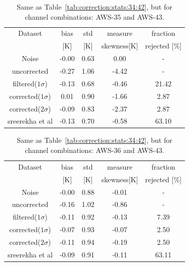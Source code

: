 \documentclass[12pt]{article}
\begin{document}
\begin{table}[!bt]
	\centering
	\begin{tabular}[b]{c|c|c|c|c}
		Dataset  		  &   bias &   std &   measure & fraction \\
							&   [K]  &   [K] & skewness[K] & rejected [\%]\\
		\hline
 Noise           	  &  -0.00 &  0.63 &               0.00 &                -\\
uncorrected     	  &  -0.27 &  1.06 &              -4.42 &                - \\
filtered($1\sigma$)	  &  -0.13 &  0.68 &              -0.46 &               21.42 \\
corrected($1\sigma$)  &   0.01 &  0.90 &              -1.66 &                2.87 \\
corrected($2\sigma$)  &  -0.09 &  0.83 &              -2.37 &                2.87 \\
sreerekha et al  	  &  -0.13 &  0.70 &              -0.58 &               63.10 \\

		\hline
	\end{tabular}
	\caption{Same as Table~\ref{tab:correction:stats:34:42}, but for channel combinations: AWS-35 and AWS-43.   }
	\label{tab:correction:stats:35:43}
\end{table}

\begin{table}[!bt]
	\centering
	\begin{tabular}[b]{c|c|c|c|c}
		Dataset  		  &   bias &   std &   measure & fraction  \\
							&   [K]  &   [K] & skewness[K] & rejected [\%]\\
		\hline
 Noise            	 &  -0.00 &  0.88 &              -0.01 &               - \\
uncorrected      	 &  -0.16 &  1.02 &              -0.86 &                - \\
filtered($1\sigma$)  &  -0.11 &  0.92 &              -0.13 &                7.39 \\
corrected($1\sigma$) &  -0.07 &  0.93 &              -0.07 &                2.50 \\
corrected($2\sigma$) &  -0.11 &  0.94 &              -0.19 &                2.50 \\
sreerekha et al 	 &  -0.09 &  0.91 &              -0.11 &               63.11 \\
		\hline
	\end{tabular}
	\caption{Same as Table~\ref{tab:correction:stats:34:42}, but for channel combinations: AWS-36 and AWS-43.   }
	\label{tab:correction:stats:36:43}
\end{table}
\end{document}
